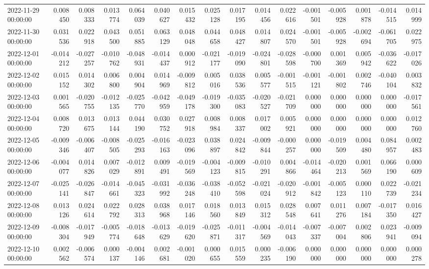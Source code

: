 \begin{tabular}{lrrrrrrrrrrrrrrr}
2022-11-29 00:00:00 & 0.008450 & 0.008333 & 0.013774 & 0.064039 & 0.040627 & 0.015432 & 0.025128 & 0.017195 & 0.014456 & 0.022616 & -0.001501 & -0.005928 & 0.001878 & -0.014515 & 0.014999 \\
2022-11-30 00:00:00 & 0.031536 & 0.022918 & 0.043500 & 0.051885 & 0.063129 & 0.048048 & 0.044658 & 0.048427 & 0.014807 & 0.024570 & -0.001501 & -0.005928 & -0.002694 & -0.061705 & 0.022975 \\
2022-12-01 00:00:00 & -0.014212 & -0.027257 & -0.010762 & -0.048931 & -0.014437 & 0.000912 & -0.021177 & -0.019090 & -0.024801 & -0.028598 & -0.000700 & 0.001369 & 0.005942 & -0.036622 & -0.017026 \\
2022-12-02 00:00:00 & 0.015152 & 0.014302 & 0.006800 & 0.004904 & 0.014969 & -0.009812 & 0.005016 & 0.038536 & 0.005577 & -0.001515 & -0.001121 & -0.001802 & 0.002746 & -0.040104 & 0.003832 \\
2022-12-03 00:00:00 & 0.001565 & -0.020755 & -0.012135 & -0.025770 & -0.042959 & -0.049178 & -0.019300 & -0.035083 & -0.020527 & -0.021709 & 0.000000 & 0.000000 & 0.000000 & 0.000000 & -0.017561 \\
2022-12-04 00:00:00 & 0.008720 & 0.013675 & 0.013144 & 0.044190 & 0.030752 & 0.027918 & 0.008984 & 0.008337 & 0.017002 & 0.005921 & 0.000000 & 0.000000 & 0.000000 & 0.000000 & 0.012760 \\
2022-12-05 00:00:00 & -0.009346 & -0.006407 & -0.008505 & -0.025293 & -0.016163 & -0.023096 & 0.038897 & 0.024842 & -0.009844 & -0.000257 & 0.000000 & -0.019509 & 0.004480 & 0.084957 & 0.002483 \\
2022-12-06 00:00:00 & -0.004077 & 0.014826 & 0.007029 & -0.012891 & 0.009491 & -0.019569 & -0.004123 & -0.009815 & -0.010291 & 0.004866 & -0.014464 & -0.020213 & 0.001569 & 0.066190 & 0.000609 \\
2022-12-07 00:00:00 & -0.025141 & -0.026847 & -0.014661 & -0.045323 & -0.031992 & -0.036248 & -0.038410 & -0.052598 & -0.021024 & -0.020912 & -0.001842 & -0.005123 & 0.000110 & 0.022739 & -0.021234 \\
2022-12-08 00:00:00 & 0.013126 & 0.024614 & 0.022792 & 0.028313 & 0.038968 & 0.017146 & 0.018560 & 0.013849 & 0.015312 & 0.028548 & 0.007641 & 0.011276 & 0.007184 & -0.017350 & 0.016427 \\
2022-12-09 00:00:00 & -0.008304 & -0.017949 & -0.005774 & -0.018648 & -0.013629 & -0.019620 & -0.025871 & -0.011317 & -0.004569 & -0.014043 & -0.007337 & -0.007004 & 0.002806 & 0.023941 & -0.009094 \\
2022-12-10 00:00:00 & 0.002562 & -0.006574 & 0.000137 & -0.004146 & 0.002681 & -0.001020 & 0.000655 & 0.015559 & 0.000235 & -0.006190 & 0.000000 & 0.000000 & 0.000000 & 0.000000 & 0.000278 \\

\end{tabular}
